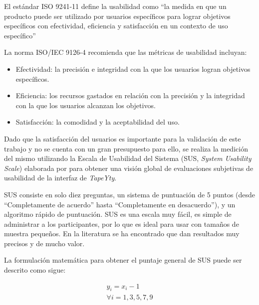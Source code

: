 El estándar ISO 9241-11 define la usabilidad como ``la medida en que un producto puede ser utilizado por usuarios específicos para lograr objetivos específicos con efectividad, eficiencia y satisfacción en un contexto de uso específico''

La norma ISO/IEC 9126-4 recomienda que las métricas de usabilidad incluyan:

\begin{itemize}
    \item Efectividad: la precisión e integridad con la que los usuarios logran objetivos específicos.
    \item Eficiencia: los recursos gastados en relación con la precisión y la integridad con la que los usuarios alcanzan los objetivos.
    \item Satisfacción: la comodidad y la aceptabilidad del uso.
\end{itemize}

Dado que la satisfacción del usuarios es importante para la validación de este trabajo y no se cuenta con un gran presupuesto para ello, se realiza la medición del mismo utilizando la Escala de Usabilidad del Sistema (SUS, \textit{System Usability Scale}) elaborada por \cite{Brooke1986SUSScale} para obtener una visión global de evaluaciones subjetivas de usabilidad de la interfaz de \textit{TapeYty}.

SUS consiste en solo diez preguntas, un sistema de puntuación de 5 puntos (desde ``Completamente de acuerdo'' hasta ``Completamente en desacuerdo''), y un algoritmo rápido de puntuación. SUS es una escala muy fácil, es simple de administrar a los participantes, por lo que es ideal para usar con tamaños de muestra pequeños. En la literatura se ha encontrado que dan resultados muy precisos y de mucho valor.

La formulación matemática para obtener el puntaje general de SUS puede ser descrito como sigue:

\begin{equation} \label{eqSus1}
\begin{gathered}
y_{i} = x_{i} - 1 \\
\forall i = {1, 3, 5, 7,9}
\end{gathered}
\end{equation} 
\hbox{}


